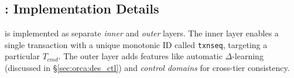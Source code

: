 
\subsection{\twopc{}: Implementation Details}
\label{sec:orca:impl-ctl}

\twopc{} is implemented as separate \emph{inner} and \emph{outer} layers.
The inner layer enables a single transaction with a unique monotonic ID called \texttt{txnseq},
targeting a particular $T_{cmd}$.
The outer layer adds features like automatic $\Delta$-learning (discussed in
\S\ref{sec:orca:des_ctl}) and \emph{control domains} for cross-tier consistency.


